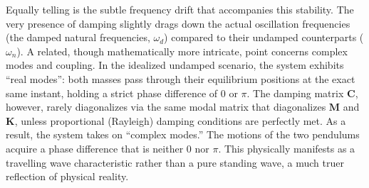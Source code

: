 \documentclass[12pt, a4paper, twoside]{article}
\begin{document}
Equally telling is the subtle frequency drift that accompanies this stability. The very presence of damping slightly drags down the actual oscillation frequencies (the damped natural frequencies, $\omega_d$) compared to their undamped counterparts ($\omega_n$). A related, though mathematically more intricate, point concerns complex modes and coupling. In the idealized undamped scenario, the system exhibits ``real modes'': both masses pass through their equilibrium positions at the exact same instant, holding a strict phase difference of $0$ or $\pi$. The damping matrix $\mathbf{C}$, however, rarely diagonalizes via the same modal matrix that diagonalizes $\mathbf{M}$ and $\mathbf{K}$, unless proportional (Rayleigh) damping conditions are perfectly met. As a result, the system takes on ``complex modes.'' The motions of the two pendulums acquire a phase difference that is neither $0$ nor $\pi$. This physically manifests as a travelling wave characteristic rather than a pure standing wave, a much truer reflection of physical reality.



\end{document}
